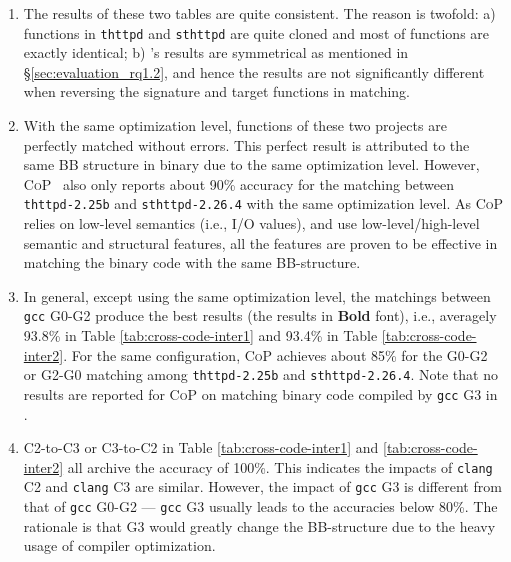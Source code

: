  \begin{enumerate}[itemsep=0.15mm]
 \item The results of these two tables are quite consistent. The reason is twofold:  a)  functions in \texttt{thttpd} and \texttt{sthttpd} are quite cloned and most of functions are exactly identical; b) \toolNew's results are symmetrical as mentioned in \S\ref{sec:evaluation_rq1.2}, and hence the results are not significantly different when reversing the signature and target functions in matching.
 \item With the same optimization level, functions of these two projects are perfectly matched without errors. This perfect result is attributed to the same  BB structure in binary due to the same optimization level.  However, \textsc{CoP}~\cite{luo2014semantics,cop-tse} also only reports about 90\% accuracy for the matching between \texttt{thttpd-2.25b}  and \texttt{sthttpd-2.26.4} with the same optimization level. As  \textsc{CoP} relies on low-level semantics (i.e., I/O values), and \toolNew use low-level/high-level semantic and structural features, all the features are proven to be effective in matching the binary code with the same BB-structure.
 \item  In general, except using the same optimization level,  the matchings between \texttt{gcc} G0-G2 produce the best results (the results in \textbf{Bold}  font), i.e., averagely 93.8\%  in Table \ref{tab:cross-code-inter1} and 93.4\% in Table \ref{tab:cross-code-inter2}. For the same configuration,  \textsc{CoP} achieves about 85\% for the G0-G2 or G2-G0 matching among  \texttt{thttpd-2.25b}  and \texttt{sthttpd-2.26.4}.  Note that no results are reported for  \textsc{CoP}  on matching binary code compiled by \texttt{gcc} G3 in \cite{luo2014semantics,cop-tse}.
  \item  C2-to-C3 or C3-to-C2 in Table \ref{tab:cross-code-inter1} and \ref{tab:cross-code-inter2} all archive the accuracy of 100\%. This indicates the impacts of \texttt{clang} C2 and \texttt{clang} C3 are similar. However, the impact of \texttt{gcc} G3 is different from that of \texttt{gcc} G0-G2 --- \texttt{gcc} G3 usually leads to the accuracies below 80\%. The rationale is that G3 would greatly change the BB-structure due to the heavy usage of compiler optimization.
\end{enumerate}

\vspace{2mm}
\noindent{}


